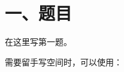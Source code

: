 \documentclass[12pt,a4paper]{scrartcl}
\begin{document}
\makecompacttitle

\section*{一、题目}

\begin{questions}
  \item 在这里写第一题。

  \item 需要留手写空间时，可以使用：\answerspace{4cm}
\end{questions}
\end{document}

